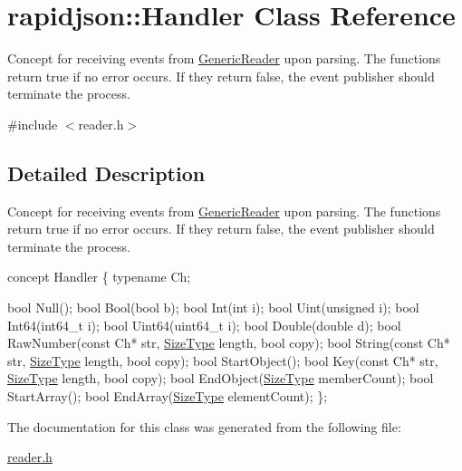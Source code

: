 \hypertarget{a02576}{}\section{rapidjson\+:\+:Handler Class Reference}
\label{a02576}


Concept for receiving events from \hyperlink{a02220}{Generic\+Reader} upon parsing. The functions return true if no error occurs. If they return false, the event publisher should terminate the process.  




{\ttfamily \#include $<$reader.\+h$>$}



\subsection{Detailed Description}
Concept for receiving events from \hyperlink{a02220}{Generic\+Reader} upon parsing. The functions return true if no error occurs. If they return false, the event publisher should terminate the process. 


\begin{DoxyCode}
concept Handler \{
    \textcolor{keyword}{typename} Ch;

    \textcolor{keywordtype}{bool} Null();
    \textcolor{keywordtype}{bool} Bool(\textcolor{keywordtype}{bool} b);
    \textcolor{keywordtype}{bool} Int(\textcolor{keywordtype}{int} i);
    \textcolor{keywordtype}{bool} Uint(\textcolor{keywordtype}{unsigned} i);
    \textcolor{keywordtype}{bool} Int64(int64\_t i);
    \textcolor{keywordtype}{bool} Uint64(uint64\_t i);
    \textcolor{keywordtype}{bool} Double(\textcolor{keywordtype}{double} d);
    \textcolor{keywordtype}{bool} RawNumber(\textcolor{keyword}{const} Ch* str, \hyperlink{a00560_a5ed6e6e67250fadbd041127e6386dcb5}{SizeType} length, \textcolor{keywordtype}{bool} copy);
    \textcolor{keywordtype}{bool} String(\textcolor{keyword}{const} Ch* str, \hyperlink{a00560_a5ed6e6e67250fadbd041127e6386dcb5}{SizeType} length, \textcolor{keywordtype}{bool} copy);
    \textcolor{keywordtype}{bool} StartObject();
    \textcolor{keywordtype}{bool} Key(\textcolor{keyword}{const} Ch* str, \hyperlink{a00560_a5ed6e6e67250fadbd041127e6386dcb5}{SizeType} length, \textcolor{keywordtype}{bool} copy);
    \textcolor{keywordtype}{bool} EndObject(\hyperlink{a00560_a5ed6e6e67250fadbd041127e6386dcb5}{SizeType} memberCount);
    \textcolor{keywordtype}{bool} StartArray();
    \textcolor{keywordtype}{bool} EndArray(\hyperlink{a00560_a5ed6e6e67250fadbd041127e6386dcb5}{SizeType} elementCount);
\};
\end{DoxyCode}
 

The documentation for this class was generated from the following file\+:\begin{DoxyCompactItemize}
\item 
\hyperlink{a00563}{reader.\+h}\end{DoxyCompactItemize}
